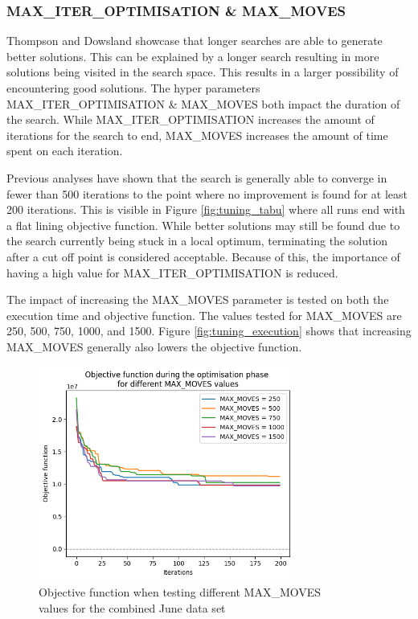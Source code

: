 \subsubsection{MAX\_ITER\_OPTIMISATION \& MAX\_MOVES}

Thompson and Dowsland \cite{thompson1996} showcase that longer searches are able to generate better solutions. This can be explained by a longer search resulting in more solutions being visited in the search space. This results in a larger possibility of encountering good solutions. The hyper parameters MAX\_ITER\_OPTIMISATION \& MAX\_MOVES both impact the duration of the search. While MAX\_ITER\_OPTIMISATION increases the amount of iterations for the search to end, MAX\_MOVES increases the amount of time spent on each iteration. 

Previous analyses have shown that the search is generally able to converge in fewer than 500 iterations to the point where no improvement is found for at least 200 iterations. This is visible in Figure \ref{fig:tuning_tabu} where all runs end with a flat lining objective function. While better solutions may still be found due to the search currently being stuck in a local optimum, terminating the solution after a cut off point is considered acceptable. Because of this, the importance of having a high value for MAX\_ITER\_OPTIMISATION is reduced.

The impact of increasing the MAX\_MOVES parameter is tested on both the execution time and objective function. The values tested for MAX\_MOVES are 250, 500, 750, 1000, and 1500. Figure \ref{fig:tuning_execution} shows that increasing MAX\_MOVES generally also lowers the objective function. 

\begin{figure}[H]
	\centering
	\includegraphics[width=0.75\textwidth]{images/tuning/max_moves_objective.png} 
	\caption{Objective function when testing different MAX\_MOVES \\ values for the combined June data set}
	\label{fig:tuning_objective}
\end{figure}

